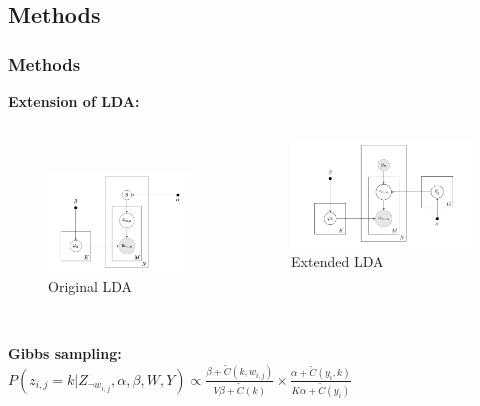 \documentclass[t,ignorenonframetext]{beamer}
\begin{document}
\subsection{Methods}
\begin{frame}
\frametitle{Methods}

\textbf{Extension of LDA:}
\begin{columns}
\begin{column}{0.50\textwidth}
	~\\
	\begin{figure}
		\includegraphics[scale=0.2]{original_lda}
		\caption{Original LDA}
	\end{figure}
\end{column}
\begin{column}{0.50\textwidth}
	\begin{figure}
		\includegraphics[scale=0.2]{plate2}
		\caption{Extended LDA}
	\end{figure}
\end{column}
\end{columns}
~\\
\textbf{Gibbs sampling:}\\
$P(z_{i,j} = k | Z_{\neg w_{i,j}}, \alpha, \beta, W, Y) \propto \frac{\beta + \widetilde{C}(k, w_{i,j})}{V\beta + \widetilde{C}(k)} \times \frac{\alpha + \widetilde{C}(y_i, k)}{K\alpha + \widetilde{C}(y_i)}$
\end{frame}
\end{document}
